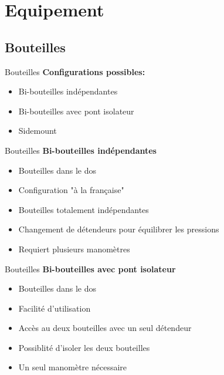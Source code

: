 
\section{Equipement}

\subsection{Bouteilles}

\begin{frame}{Bouteilles}
	\textbf{Configurations possibles:}
	\begin{itemize}
		\item Bi-bouteilles indépendantes
		\item Bi-bouteilles avec pont isolateur
		\item Sidemount
	\end{itemize}
\end{frame}

\begin{frame}{Bouteilles}  
	\textbf{Bi-bouteilles indépendantes}
	\begin{itemize}
		\item Bouteilles dans le dos
		\item Configuration "à la française"
		\item Bouteilles totalement indépendantes
		\item Changement de détendeurs pour équilibrer les pressions
		\item Requiert plusieurs manomètres
	\end{itemize}
\end{frame}

\begin{frame}{Bouteilles}  
	\textbf{Bi-bouteilles avec pont isolateur}
	\begin{itemize}
		\item Bouteilles dans le dos
		\item Facilité d'utilisation
		\item Accès au deux bouteilles avec un seul détendeur
		\item Possiblité d'isoler les deux bouteilles
		\item Un seul manomètre nécessaire
	\end{itemize}
\end{frame}

